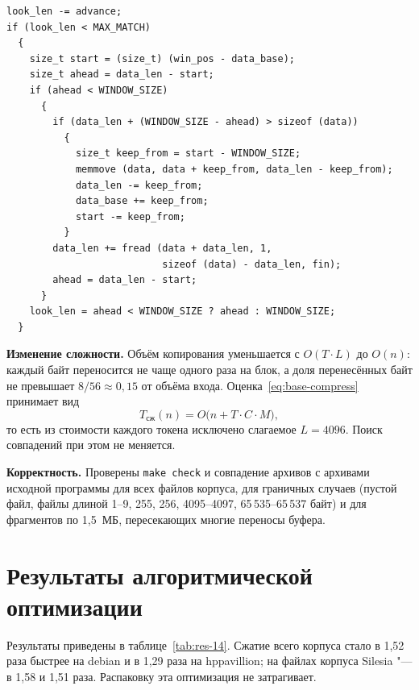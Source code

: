 \begin{lstlisting}[caption={Дополнение общего буфера (после оптимизации)},label={lst:memmove-after}]
look_len -= advance;
if (look_len < MAX_MATCH)
  {
    size_t start = (size_t) (win_pos - data_base);
    size_t ahead = data_len - start;
    if (ahead < WINDOW_SIZE)
      {
        if (data_len + (WINDOW_SIZE - ahead) > sizeof (data))
          {
            size_t keep_from = start - WINDOW_SIZE;
            memmove (data, data + keep_from, data_len - keep_from);
            data_len -= keep_from;
            data_base += keep_from;
            start -= keep_from;
          }
        data_len += fread (data + data_len, 1,
                           sizeof (data) - data_len, fin);
        ahead = data_len - start;
      }
    look_len = ahead < WINDOW_SIZE ? ahead : WINDOW_SIZE;
  }
\end{lstlisting}

\textbf{Изменение сложности.} Объём копирования уменьшается с
$O(T \cdot L)$ до $O(n)$: каждый байт переносится не чаще одного раза на
блок, а доля перенесённых байт не превышает $8/56 \approx 0{,}15$ от объёма
входа. Оценка~\eqref{eq:base-compress} принимает вид
\begin{equation}
\label{eq:after-14}
T_{\text{сж}}(n) = O\bigl(n + T \cdot C \cdot M\bigr),
\end{equation}
то есть из стоимости каждого токена исключено слагаемое $L = 4096$.
Поиск совпадений при этом не меняется.

\textbf{Корректность.} Проверены \texttt{make check} и совпадение архивов
с архивами исходной программы для всех файлов корпуса, для граничных
случаев (пустой файл, файлы длиной 1--9, 255, 256, 4095--4097,
65\,535--65\,537 байт) и для фрагментов по 1,5~МБ, пересекающих многие
переносы буфера.

\section{Результаты алгоритмической оптимизации}

Результаты приведены в таблице~\ref{tab:res-14}. Сжатие всего корпуса стало
в 1,52 раза быстрее на debian и в 1,29 раза на hppavillion; на файлах
корпуса Silesia "--- в 1,58 и 1,51 раза. Распаковку эта оптимизация не
затрагивает.

